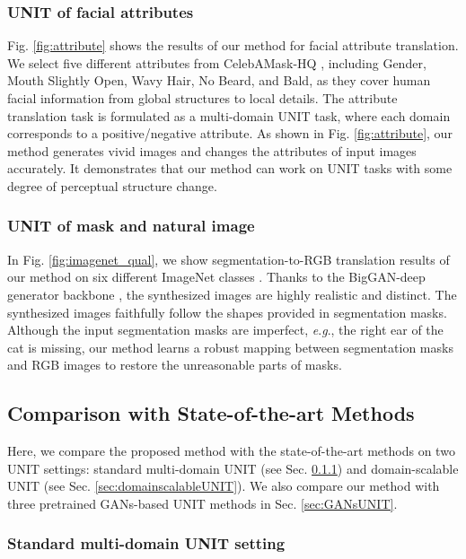 \documentclass[10pt,journal,compsoc]{IEEEtran}
\newcommand{\eg}{\textit{e}.\textit{g}.}
\begin{document}
{\subsubsection{UNIT of facial attributes}
Fig. \ref{fig:attribute} shows the results of our method for facial attribute translation. 
We select five different attributes from CelebAMask-HQ \cite{celebamaskhq}, including Gender, Mouth Slightly Open, Wavy Hair, No Beard, and Bald, as they cover human facial information from global structures to local details. The attribute translation task is formulated as a multi-domain UNIT task, where each domain corresponds to a positive/negative attribute. 
As shown in Fig. \ref{fig:attribute}, our method generates vivid images and changes the attributes of input images accurately. It demonstrates that our method can work on UNIT tasks with some degree of perceptual structure change.

\subsubsection{UNIT of mask and natural image}

In Fig. \ref{fig:imagenet_qual}, we show segmentation-to-RGB translation results of our method on six different ImageNet classes \cite{imagenet}. Thanks to the BigGAN-deep generator backbone \cite{biggan}, the synthesized images are highly realistic and distinct. The synthesized images faithfully follow the shapes provided in segmentation masks. Although the input segmentation masks are imperfect, \eg, the right ear of the cat is missing, our method learns a robust mapping between segmentation masks and RGB images to restore the unreasonable parts of masks.


\subsection{Comparison with State-of-the-art Methods}
Here, we compare the proposed method with the state-of-the-art methods on two UNIT settings: standard multi-domain UNIT (see Sec. \ref{sec:standardUNIT}) and domain-scalable UNIT (see Sec. \ref{sec:domainscalableUNIT}). We also compare our method with three pretrained GANs-based UNIT methods in Sec. \ref{sec:GANsUNIT}.

\subsubsection{Standard multi-domain UNIT setting}
\label{sec:standardUNIT}

}
\end{document}
